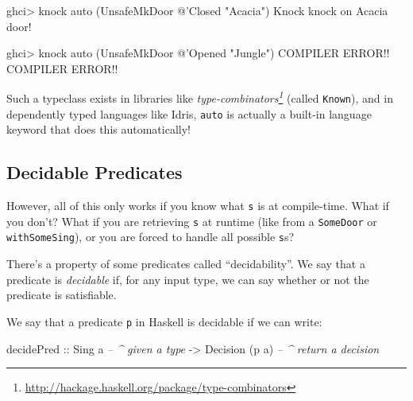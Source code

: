 \documentclass[]{article}
\newenvironment{Shaded}{}{}
\newcommand{\CommentTok}[1]{\textcolor[rgb]{0.38,0.63,0.69}{\textit{#1}}}
\newcommand{\DataTypeTok}[1]{\textcolor[rgb]{0.56,0.13,0.00}{#1}}
\newcommand{\FunctionTok}[1]{\textcolor[rgb]{0.02,0.16,0.49}{#1}}
\newcommand{\NormalTok}[1]{#1}
\newcommand{\OtherTok}[1]{\textcolor[rgb]{0.00,0.44,0.13}{#1}}
\newcommand{\StringTok}[1]{\textcolor[rgb]{0.25,0.44,0.63}{#1}}
\renewcommand{\href}[2]{#2\footnote{\url{#1}}}
\begin{document}
\begin{Shaded}
\begin{Highlighting}[]
\NormalTok{ghci}\FunctionTok{>}\NormalTok{ knock auto (}\DataTypeTok{UnsafeMkDoor} \FunctionTok{@}\NormalTok{'}\DataTypeTok{Closed} \StringTok{"Acacia"}\NormalTok{)}
\DataTypeTok{Knock}\NormalTok{ knock on }\DataTypeTok{Acacia}\NormalTok{ door}\FunctionTok{!}

\NormalTok{ghci}\FunctionTok{>}\NormalTok{ knock auto (}\DataTypeTok{UnsafeMkDoor} \FunctionTok{@}\NormalTok{'}\DataTypeTok{Opened} \StringTok{"Jungle"}\NormalTok{)}
\DataTypeTok{COMPILER} \DataTypeTok{ERROR}\FunctionTok{!!} \DataTypeTok{COMPILER} \DataTypeTok{ERROR}\FunctionTok{!!}
\end{Highlighting}
\end{Shaded}

Such a typeclass exists in libraries like
\emph{\href{http://hackage.haskell.org/package/type-combinators}{type-combinators}}
(called \texttt{Known}), and in dependently typed languages like Idris,
\texttt{auto} is actually a built-in language keyword that does this
automatically!

\hypertarget{decidable-predicates}{%
\subsection{Decidable Predicates}\label{decidable-predicates}}

However, all of this only works if you know what \texttt{s} is at compile-time.
What if you don't? What if you are retrieving \texttt{s} at runtime (like from a
\texttt{SomeDoor} or \texttt{withSomeSing}), or you are forced to handle all
possible \texttt{s}s?

There's a property of some predicates called ``decidability''. We say that a
predicate is \emph{decidable} if, for any input type, we can say whether or not
the predicate is satisfiable.

We say that a predicate \texttt{p} in Haskell is decidable if we can write:

\begin{Shaded}
\begin{Highlighting}[]
\NormalTok{decidePred}
\OtherTok{    ::} \DataTypeTok{Sing}\NormalTok{ a               }\CommentTok{-- ^ given a type}
    \OtherTok{->} \DataTypeTok{Decision}\NormalTok{ (p a)       }\CommentTok{-- ^ return a decision}
\end{Highlighting}
\end{Shaded}
\end{document}
